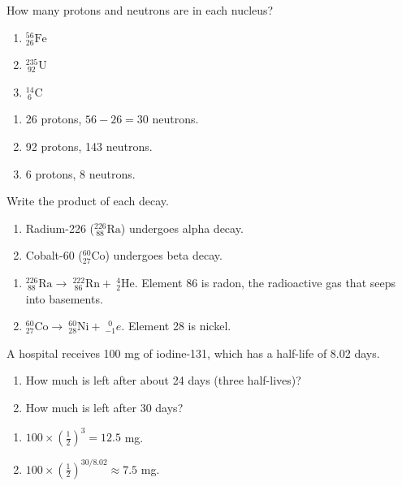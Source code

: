 \begin{Exercise}[title={Counting Nucleons}, label=np_count]
How many protons and neutrons are in each nucleus?
\begin{enumerate}
\item $^{56}_{26}\text{Fe}$
\item $^{235}_{\ 92}\text{U}$
\item $^{14}_{\ 6}\text{C}$
\end{enumerate}
\end{Exercise}
\begin{Answer}[ref=np_count]
\begin{enumerate}
\item 26 protons, $56 - 26 = 30$ neutrons.
\item 92 protons, 143 neutrons.
\item 6 protons, 8 neutrons.
\end{enumerate}
\end{Answer}

\begin{Exercise}[title={Complete the Decay}, label=np_decay]
Write the product of each decay.
\begin{enumerate}
\item Radium-226 ($^{226}_{\ 88}\text{Ra}$) undergoes alpha decay.
\item Cobalt-60 ($^{60}_{27}\text{Co}$) undergoes beta decay.
\end{enumerate}
\end{Exercise}
\begin{Answer}[ref=np_decay]
\begin{enumerate}
\item $^{226}_{\ 88}\text{Ra} \to\ ^{222}_{\ 86}\text{Rn} +\ ^4_2\text{He}$. Element 86 is radon, the radioactive gas
that seeps into basements.
\item $^{60}_{27}\text{Co} \to\ ^{60}_{28}\text{Ni} +\ ^{\ \,0}_{-1}e$. Element 28 is nickel.
\end{enumerate}
\end{Answer}

\begin{Exercise}[title={A Medical Isotope}, label=np_iodine]
A hospital receives 100 mg of iodine-131, which has a half-life of 8.02 days.
\begin{enumerate}
\item How much is left after about 24 days (three half-lives)?
\item How much is left after 30 days?
\end{enumerate}
\end{Exercise}
\begin{Answer}[ref=np_iodine]
\begin{enumerate}
\item $100 \times \left(\frac{1}{2}\right)^3 = 12.5$ mg.
\item $100 \times \left(\frac{1}{2}\right)^{30/8.02} \approx 7.5$ mg.
\end{enumerate}
\end{Answer}

